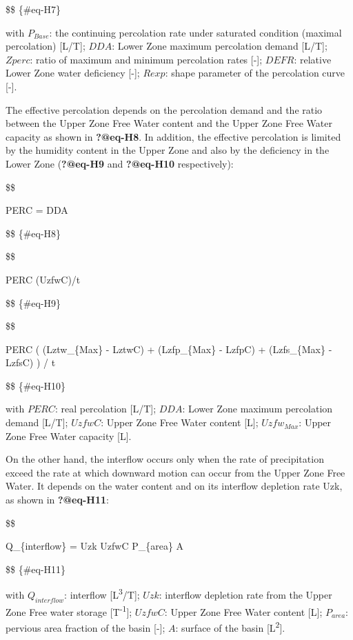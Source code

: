 \documentclass[
  letterpaper,
  DIV=11,
  numbers=noendperiod]{scrreprt}
\begin{document}
\$\$ \{\#eq-H7\}

with \(P_{Base}\): the continuing percolation rate under saturated
condition (maximal percolation) {[}L/T{]}; \(DDA\): Lower Zone maximum
percolation demand {[}L/T{]}; \(Zperc\): ratio of maximum and minimum
percolation rates {[}-{]}; \(DEFR\): relative Lower Zone water
deficiency {[}-{]}; \(Rexp\): shape parameter of the percolation curve
{[}-{]}.

The effective percolation depends on the percolation demand and the
ratio between the Upper Zone Free Water content and the Upper Zone Free
Water capacity as shown in \textbf{?@eq-H8}. In addition, the effective
percolation is limited by the humidity content in the Upper Zone and
also by the deficiency in the Lower Zone (\textbf{?@eq-H9} and
\textbf{?@eq-H10} respectively):

\$\$

PERC = DDA \cdot {}

\$\$ \{\#eq-H8\}

\$\$

PERC \leq {}(UzfwC)/t

\$\$ \{\#eq-H9\}

\$\$

PERC \leq {} \Big( (Lztw\_\{Max\} - LztwC) + (Lzfp\_\{Max\} -
LzfpC) + (Lzfs\_\{Max\} - LzfsC) \Big) / t

\$\$ \{\#eq-H10\}

with \(PERC\): real percolation {[}L/T{]}; \(DDA\): Lower Zone maximum
percolation demand {[}L/T{]}; \(UzfwC\): Upper Zone Free Water content
{[}L{]}; \(Uzfw_{Max}\): Upper Zone Free Water capacity {[}L{]}.

On the other hand, the interflow occurs only when the rate of
precipitation exceed the rate at which downward motion can occur from
the Upper Zone Free Water. It depends on the water content and on its
interflow depletion rate Uzk, as shown in \textbf{?@eq-H11}:

\$\$

Q\_\{interflow\} = Uzk \cdot UzfwC \cdot P\_\{area\} \cdot A

\$\$ \{\#eq-H11\}

with \(Q_{interflow}\): interflow {[}L\textsuperscript{3}/T{]}; \(Uzk\):
interflow depletion rate from the Upper Zone Free water storage
{[}T\textsuperscript{-1}{]}; \(UzfwC\): Upper Zone Free Water content
{[}L{]}; \(P_{area}\): pervious area fraction of the basin {[}-{]};
\(A\): surface of the basin {[}L\textsuperscript{2}{]}.
\end{document}
